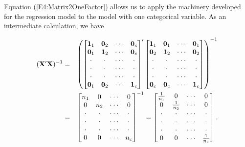 Equation (\ref{E4:Matrix2OneFactor}) allows us to apply the
machinery developed for the regression model to the model with one
categorical variable. As an intermediate calculation, we have

\begin{center}
\begin{eqnarray}\label{E4:OneFactorXPrimeX}
(\mathbf{X^{\prime}X})^{-1} &=&\left(
\begin{bmatrix}
\mathbf{1}_1 & \mathbf{0}_2 & \cdot \cdot \cdot  & \mathbf{0}_c \\
\mathbf{0}_1 & \mathbf{1}_2 & \cdot \cdot \cdot  & \mathbf{0}_c \\
\cdot  & \cdot  & \cdot \cdot \cdot  & \cdot  \\
\cdot  & \cdot  & \cdot \cdot \cdot  & \cdot  \\
\cdot  & \cdot  & \cdot \cdot \cdot  & \cdot  \\
\mathbf{0}_1 & \mathbf{0}_2 & \cdot \cdot \cdot  & \mathbf{1}_c%
\end{bmatrix}^{\prime}%
\begin{bmatrix}
\mathbf{1}_1 & \mathbf{0}_1 & \cdot \cdot \cdot  & \mathbf{0}%
_1 \\
\mathbf{0}_2 & \mathbf{1}_2 & \cdot \cdot \cdot  & \mathbf{0}%
_2 \\
\cdot  & \cdot  & \cdot \cdot \cdot  & \cdot  \\
\cdot  & \cdot  & \cdot \cdot \cdot  & \cdot  \\
\cdot  & \cdot  & \cdot \cdot \cdot  & \cdot  \\
\mathbf{0}_{c} & \mathbf{0}_{c} & \cdot \cdot \cdot  & \mathbf{1}_c
\end{bmatrix} \notag
\right) ^{-1} \\
&=&%
\begin{bmatrix}
n_1 & 0 & \cdot \cdot \cdot  & 0 \\
0 & n_2 & \cdot \cdot \cdot  & 0 \\
\cdot  & \cdot  & \cdot \cdot \cdot  & \cdot  \\
\cdot  & \cdot  & \cdot \cdot \cdot  & \cdot  \\
\cdot  & \cdot  & \cdot \cdot \cdot  & \cdot  \\
0 & 0 & \cdot \cdot \cdot  & n_c%
\end{bmatrix}%
^{-1}=%
\begin{bmatrix}
\frac{1}{n_1} & 0 & \cdot \cdot \cdot  & 0 \\
0 & \frac{1}{n_2} & \cdot \cdot \cdot  & 0 \\
\cdot  & \cdot  & \cdot \cdot \cdot  & \cdot  \\
\cdot  & \cdot  & \cdot \cdot \cdot  & \cdot  \\
\cdot  & \cdot  & \cdot \cdot \cdot  & \cdot  \\
0 & 0 & \cdot \cdot \cdot  & \frac{1}{n_c}
\end{bmatrix}%
.
\end{eqnarray}
\end{center}

